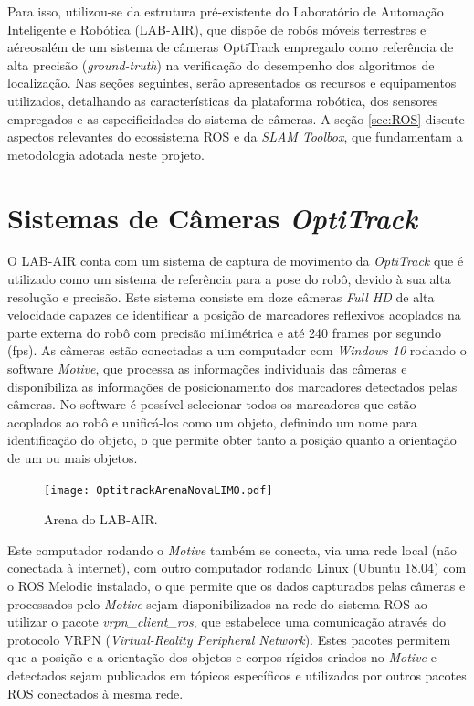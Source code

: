Para isso, utilizou-se da estrutura pré-existente do Laboratório de Automação Inteligente e Robótica (LAB-AIR), que dispõe de robôs móveis terrestres e aéreosalém de um sistema de câmeras OptiTrack empregado como referência de alta precisão (\textit{ground-truth}) na verificação do desempenho dos algoritmos de localização. 
Nas seções seguintes, serão apresentados os recursos e equipamentos utilizados, detalhando as características da plataforma robótica, dos sensores empregados e as especificidades do sistema de câmeras. A seção \ref{sec:ROS} discute aspectos relevantes do ecossistema ROS e da \textit{SLAM Toolbox}, que fundamentam a metodologia adotada neste projeto.


\section{Sistemas de Câmeras \textit{OptiTrack}}
\label{sec:Sistema_Optitrack}

    O LAB-AIR conta com um sistema de captura de movimento da \textit{OptiTrack} que é utilizado como um sistema de referência para a pose do robô, devido à sua alta resolução e precisão. Este sistema consiste em doze câmeras \textit{Full HD} de alta velocidade capazes de identificar a posição de marcadores reflexivos acoplados na parte externa do robô com precisão milimétrica e até 240 frames por segundo (fps). As câmeras estão conectadas a um computador com \textit{Windows 10} rodando o software \textit{Motive}, que processa as informações individuais das câmeras e disponibiliza as informações de posicionamento dos marcadores detectados pelas câmeras. No software é possível selecionar todos os marcadores que estão acoplados ao robô e unificá-los como um objeto, definindo um nome para identificação do objeto, o que permite obter tanto a posição quanto a orientação de um ou mais objetos.
    
    \begin{figure}[htb]
         \centering
         \caption{Arena do LAB-AIR.}
         \texttt{[image: OptitrackArenaNovaLIMO.pdf]}
         \source
         \label{fig:ArenaLAB-AIR}
     \end{figure}
    
    Este computador rodando o \textit{Motive} também se conecta, via uma rede local (não conectada à internet), com outro computador rodando Linux (Ubuntu 18.04) com o ROS Melodic instalado, o que permite que os dados capturados pelas câmeras e processados pelo \textit{Motive} sejam disponibilizados na rede do sistema ROS ao utilizar o pacote \textit{vrpn\_client\_ros}, que estabelece uma comunicação através do protocolo VRPN (\textit{Virtual-Reality Peripheral Network}). Estes pacotes permitem que a posição e a orientação dos objetos e corpos rígidos criados no \textit{Motive} e detectados sejam publicados em tópicos específicos e utilizados por outros pacotes ROS conectados à mesma rede.


